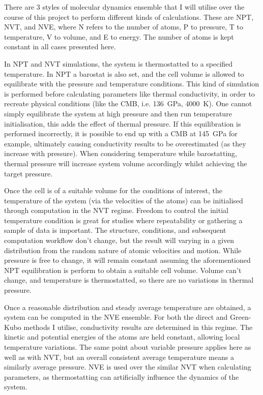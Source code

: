 There are 3 styles of molecular dynamics ensemble that I will utilise over the course of this project to perform different kinds of calculations. These are NPT, NVT, and NVE, where N refers to the number of atoms, P to pressure, T to temperature, V to volume, and E to energy. The number of atoms is kept constant in all cases presented here. 

In NPT and NVT simulations, the system is thermostatted to a specified temperature. In NPT a barostat is also set, and the cell volume is allowed to equilibrate with the pressure and temperature conditions. This kind of simulation is performed before calculating parameters like thermal conductivity, in order to recreate physical conditions (like the CMB, i.e. 136~GPa, 4000~K). One cannot simply equilibrate the system at high pressure and then run temperature initialisation, this adds the effect of thermal pressure. If this equilibration is performed incorrectly, it is possible to end up with a CMB at 145~GPa for example, ultimately causing conductivity results to be overestimated (as they increase with pressure). When considering temperature while barostatting, thermal pressure will increase system volume accordingly whilst achieving the target pressure.

Once the cell is of a suitable volume for the conditions of interest, the temperature of the system (via the velocities of the atoms) can be initialised through computation in the NVT regime. Freedom to control the initial temperature condition is great for studies where repeatability or gathering a sample of data is important. The structure, conditions, and subsequent computation workflow don't change, but the result will varying in a given distribution from the random nature of atomic velocities and motion. While pressure is free to change, it will remain constant assuming the aforementioned NPT equilibration is perform to obtain a suitable cell volume. Volume can't change, and temperature is thermostatted, so there are no variations in thermal pressure.

Once a reasonable distribution and steady average temperature are obtained, a system can be computed in the NVE ensemble. For both the direct and Green-Kubo methods I utilise, conductivity results are determined in this regime. The kinetic and potential energies of the atoms are held constant, allowing local temperature variations. The same point about variable pressure applies here as well as with NVT, but an overall consistent average temperature means a similarly average pressure. NVE is used over the similar NVT when calculating parameters, as thermostatting can artificially influence the dynamics of the system.


